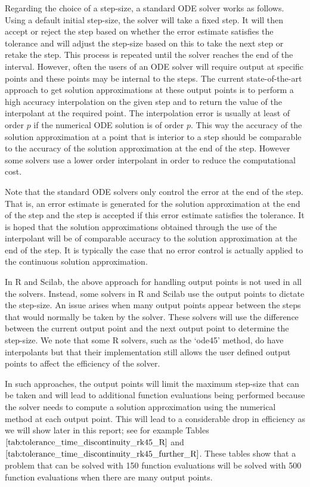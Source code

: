 Regarding the choice of a step-size, a standard ODE solver works as follows. Using a default initial step-size, the solver will take a fixed step. It will then accept or reject the step based on whether the error estimate satisfies the tolerance and will adjust the step-size based on this to take the next step or retake the step. This process is repeated until the solver reaches the end of the interval. However, often the users of an ODE solver will require output at specific points and these points may be internal to the steps. The current state-of-the-art approach to get solution approximations at these output points is to perform a high accuracy interpolation on the given step and to return the value of the interpolant at the required point. The interpolation error is usually at least of order $p$ if the numerical ODE solution is of order $p$. This way the accuracy of the solution approximation at a point that is interior to a step should be comparable to the accuracy of the solution approximation at the end of the step. However some solvers use a lower order interpolant in order to reduce the computational cost.

Note that the standard ODE solvers only control the error at the end of the step. That is, an error estimate is generated for the solution approximation at the end of the step and the step is accepted if this error estimate satisfies the tolerance. It is hoped that the solution approximations obtained through the use of the interpolant will be of comparable accuracy to the solution approximation at the end of the step. It is typically the case that no error control is actually applied to the continuous solution approximation.

In R and Scilab, the above approach for handling output points is not used in all the solvers. Instead, some solvers in R and Scilab use the output points to dictate the step-size. An issue arises when many output points appear between the steps that would normally be taken by the solver. These solvers will use the difference between the current output point and the next output point to determine the step-size. We note that some R solvers, such as the `ode45' method, do have interpolants but that their implementation still allows the user defined output points to affect the efficiency of the solver. 

In such approaches, the output points will limit the maximum step-size that can be taken and will lead to additional function evaluations being performed because the solver needs to compute a solution approximation using the numerical method at each output point. This will lead to a considerable drop in efficiency as we will show later in this report; see for example Tables $\ref{tab:tolerance_time_discontinuity_rk45_R}$ and $\ref{tab:tolerance_time_discontinuity_rk45_further_R}$. These tables show that a problem that can be solved with 150 function evaluations will be solved with 500 function evaluations when there are many output points. 

